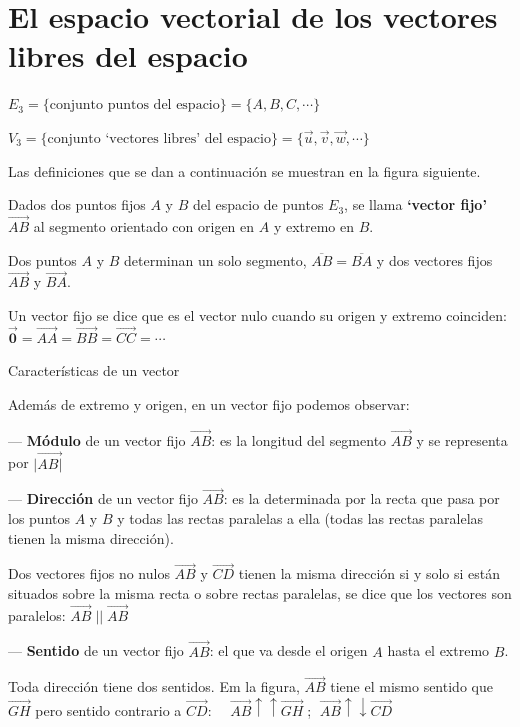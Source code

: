 \section[El espacio vectorial de los vectores libres del espacio]{El espacio vectorial de los vectores libres del espacio }


$E_3=\{\text{conjunto puntos del espacio}\}=\{A, B, C, \cdots \}$

$V_3=\{\text{conjunto `vectores libres' del espacio}\}=\{\vec u, \vec v, \vec w, \cdots \}$

\normalsize{Las} definiciones que se dan a continuación se muestran en la figura siguiente.

\begin{defi}
Dados dos puntos fijos $A$ y $B$ del espacio de puntos $E_3$, se llama \textbf{`vector fijo'} $\overrightarrow {AB}$ al segmento orientado con origen en $A$ y extremo en $B$.	
\end{defi}

Dos puntos $A$ y $B$ determinan un solo segmento, $\overline{AB}=\overline{BA}$ y dos vectores fijos  $\overrightarrow {AB}$ y  $\overrightarrow {BA}$.

Un vector fijo se dice que es el vector nulo cuando su origen y extremo coinciden: $\boldsymbol{\vec 0}= \overrightarrow {AA} =\overrightarrow {BB} = \overrightarrow {CC}=\cdots$

\vspace{2mm} \begin{defi}{Características de un vector}

Además de extremo y origen, en un vector fijo podemos observar:

--- \textbf{Módulo} de un vector fijo $\overrightarrow {AB}$: es la longitud del segmento $\overrightarrow {AB}$ y se representa por  $|\overrightarrow {AB|}$


--- \textbf{Dirección} de un vector fijo $\overrightarrow {AB}$: es la determinada por la recta que pasa por los puntos $A$ y $B$ y todas las rectas paralelas a ella \textcolor{gris}{(todas las rectas paralelas tienen la misma dirección)}.

Dos vectores fijos  no nulos $\overrightarrow {AB}$ y  $\overrightarrow {CD}$ tienen la misma dirección si y solo si están situados sobre la misma recta o sobre rectas paralelas, se dice  que los vectores son paralelos: $\overrightarrow {AB}\; ||\; \overrightarrow {AB}$


--- \textbf{Sentido} de un vector fijo $\overrightarrow {AB}$: el que va desde el origen $A$ hasta el extremo $B$.

Toda dirección tiene dos sentidos. Em la figura, $\overrightarrow {AB}$ tiene el mismo sentido que $\overrightarrow {GH}$ pero sentido contrario a $\overrightarrow {CD}$: $\quad \overrightarrow {AB} \uparrow\uparrow \overrightarrow {GH}\; $; $\; \overrightarrow {AB} \uparrow \downarrow \overrightarrow {CD}$

\end{defi}

